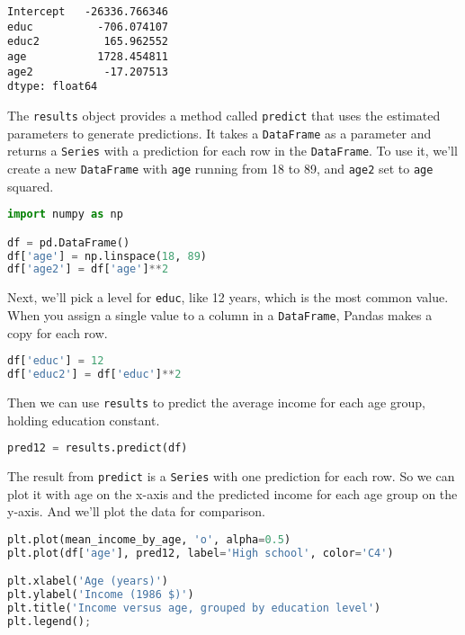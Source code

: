 \begin{lstlisting}[style=output]
Intercept   -26336.766346
educ          -706.074107
educ2          165.962552
age           1728.454811
age2           -17.207513
dtype: float64
\end{lstlisting}

The \passthrough{\lstinline!results!} object provides a method called
\passthrough{\lstinline!predict!} that uses the estimated parameters to
generate predictions. It takes a \passthrough{\lstinline!DataFrame!} as
a parameter and returns a \passthrough{\lstinline!Series!} with a
prediction for each row in the \passthrough{\lstinline!DataFrame!}. To
use it, we'll create a new \passthrough{\lstinline!DataFrame!} with
\passthrough{\lstinline!age!} running from 18 to 89, and
\passthrough{\lstinline!age2!} set to \passthrough{\lstinline!age!}
squared.

\begin{lstlisting}[language=Python,style=source]
import numpy as np

df = pd.DataFrame()
df['age'] = np.linspace(18, 89)
df['age2'] = df['age']**2
\end{lstlisting}

Next, we'll pick a level for \passthrough{\lstinline!educ!}, like 12
years, which is the most common value. When you assign a single value to
a column in a \passthrough{\lstinline!DataFrame!}, Pandas makes a copy
for each row.

\begin{lstlisting}[language=Python,style=source]
df['educ'] = 12
df['educ2'] = df['educ']**2
\end{lstlisting}

Then we can use \passthrough{\lstinline!results!} to predict the average
income for each age group, holding education constant.

\begin{lstlisting}[language=Python,style=source]
pred12 = results.predict(df)
\end{lstlisting}

The result from \passthrough{\lstinline!predict!} is a
\passthrough{\lstinline!Series!} with one prediction for each row. So we
can plot it with age on the x-axis and the predicted income for each age
group on the y-axis. And we'll plot the data for comparison.

\begin{lstlisting}[language=Python,style=source]
plt.plot(mean_income_by_age, 'o', alpha=0.5)
plt.plot(df['age'], pred12, label='High school', color='C4')

plt.xlabel('Age (years)')
plt.ylabel('Income (1986 $)')
plt.title('Income versus age, grouped by education level')
plt.legend();
\end{lstlisting}

